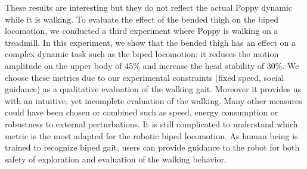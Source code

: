These results are interesting but they do not reflect the actual Poppy dynamic while it is walking. To evaluate the effect of the bended thigh on the biped locomotion, we conducted a third experiment where Poppy is walking on a treadmill. In this experiment, we show that the bended thigh has an effect on a complex dynamic task such as the biped locomotion: it reduces the motion amplitude on the upper body of 45\% and increase the head stability of 30\%. We choose these metrics due to our experimental constraints (fixed speed, social guidance) as a qualitative evaluation of the walking gait. Moreover it provides us with an intuitive, yet incomplete evaluation of the walking. Many other measures could have been chosen or combined such as speed, energy consumption or robustness to external perturbations. It is still complicated to understand which metric is the most adapted for the robotic biped locomotion. As human being is trained to recognize biped gait, users can provide guidance to the robot for both safety of exploration and evaluation of the walking behavior.


